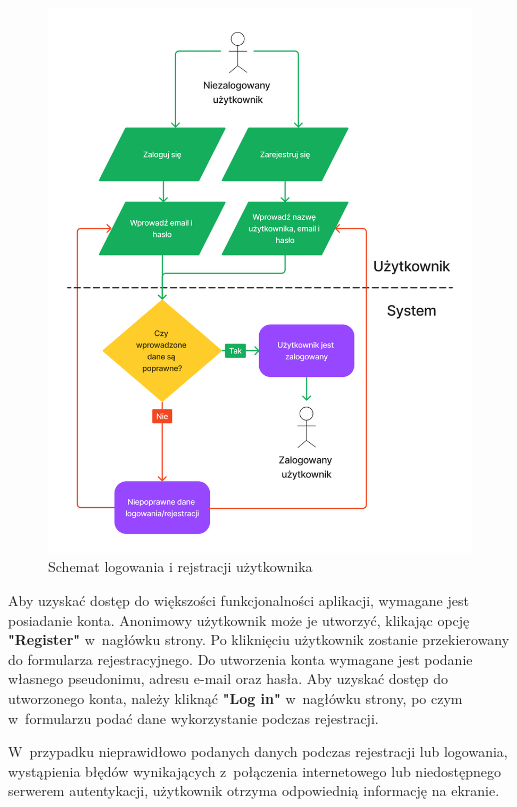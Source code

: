 \begin{figure}[!]
  \centering
  \includegraphics[width=\textwidth]{img/schematy/login.png}
  \caption{Schemat logowania i rejstracji użytkownika}
\end{figure}

Aby uzyskać dostęp do większości funkcjonalności aplikacji, wymagane
jest posiadanie konta. Anonimowy użytkownik może je utworzyć, klikając
opcję \textbf{"Register"} w~nagłówku strony. Po kliknięciu użytkownik
zostanie przekierowany do formularza rejestracyjnego.
Do utworzenia konta wymagane jest podanie własnego
pseudonimu, adresu e-mail oraz hasła. Aby uzyskać dostęp do utworzonego
konta, należy kliknąć \textbf{"Log in"} w~nagłówku strony, po czym
w~formularzu podać dane wykorzystanie podczas rejestracji.

W~przypadku nieprawidłowo podanych danych podczas rejestracji
lub logowania, wystąpienia błędów wynikających z~połączenia internetowego lub
niedostępnego serwerem autentykacji, użytkownik otrzyma odpowiednią
informację na ekranie.

